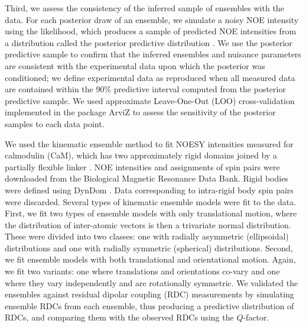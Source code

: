 \documentclass[../../main.tex]{subfiles}
\begin{document}
\begin{refsection}
	Third, we assess the consistency of the inferred sample of ensembles with the data.
	For each posterior draw of an ensemble, we simulate a noisy NOE intensity using the likelihood, which produces a sample of predicted NOE intensities from a distribution called the posterior predictive distribution \supercite{rubinBayesianlyJustifiableRelevant1984}.
	We use the posterior predictive sample to confirm that the inferred ensembles and nuisance parameters are consistent with the experimental data upon which the posterior was conditioned;
	we define experimental data as reproduced when all measured data are contained within the 90\% predictive interval computed from the posterior predictive sample.
	We used approximate Leave-One-Out (LOO) cross-validation \supercite{vehtariPracticalBayesianModel2017,vehtariParetoSmoothedImportance2019} implemented in the package ArviZ \supercite{kumarArviZUnifiedLibrary2019} to assess the sensitivity of the posterior samples to each data point.




	We used the kinematic ensemble method to fit NOESY intensities measured for calmodulin (CaM), which has two approximately rigid domains joined by a partially flexible linker \supercite{barbatoBackboneDynamicsCalmodulin1992,fragaiFourDimensionalProteinStructures2006}.
	NOE intensities and assignments of spin pairs were downloaded from the Biological Magnetic Resonance Data Bank.%
	Rigid bodies were defined using DynDom \supercite{leeDynDomDatabaseProtein2003,qiComprehensiveNonredundantDatabase2005}.%
	Data corresponding to intra-rigid body spin pairs were discarded.
	Several types of kinematic ensemble models were fit to the data.
	First, we fit two types of ensemble models with only translational motion, where the distribution of inter-atomic vectors is then a trivariate normal distribution.
	These were divided into two classes: one with radially asymmetric (ellipsoidal) distributions and one with radially symmetric (spherical) distributions.
	Second, we fit ensemble models with both translational and orientational motion.
	Again, we fit two variants: one where translations and orientations co-vary and one where they vary independently and are rotationally symmetric.
	We validated the ensembles against residual dipolar coupling (RDC) measurements by simulating ensemble RDCs from each ensemble, thus producing a predictive distribution of RDCs, and comparing them with the observed RDCs using the $Q$-factor.


\end{refsection}
\end{document}

